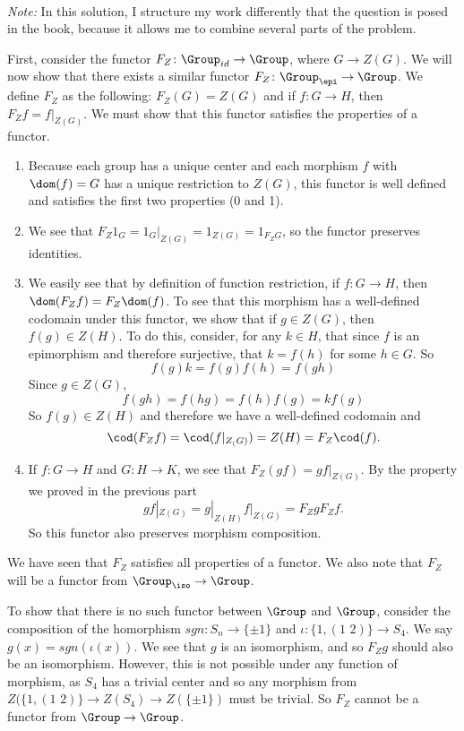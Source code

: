 \documentclass[main.tex]{subfiles}
\begin{document}
\paragraph{}
\textit{Note:} In this solution, I structure my work differently that the
question is posed in the book, because it allows me to combine several parts of
the problem.

First, consider the functor $F_Z\colon \Group_{id}\rightarrow \Group$, where $G
\rightarrow Z(G)$. We will now show that there exists a similar functor $F_Z\colon
\Group_\epi \rightarrow \Group$. We define $F_Z$ as the following: $F_Z(G) =
Z(G)$ and if $f\colon G \rightarrow H$, then $F_{Z} f = f|_{Z(G)}$. We must show that
this functor satisfies the properties of a functor.
\begin{enumerate}
	\item Because each group has a unique center and each morphism $f$ with
		$\dom(f) = G$ has a unique restriction to $Z(G)$, this functor is well
		defined and satisfies the first two properties (0 and 1).

	\item We see that $F_{Z} 1_{G} = 1_{G}|_{Z(G)} = 1_{Z(G)} = 1_{F_{Z}G}$, so
		the functor preserves identities.

	\item We easily see that by definition of function restriction, if $f\colon G
		\rightarrow H$, then $\dom(F_{Z}f) = F_{Z}\dom(f)$. To see that this
		morphism has a well-defined codomain under this functor, we show that if
		$g \in Z(G)$, then $f(g) \in Z(H)$. To do this, consider, for any $k \in
		H$, that since $f$ is an epimorphism and therefore surjective, that $k =
		f(h)$ for some $h \in G$. So \[f(g)k = f(g)f(h) = f(gh)\]Since $g \in
		Z(G)$, \[f(gh) = f(hg) = f(h)f(g) = kf(g)\] So $f(g) \in Z(H)$ and
		therefore we have a well-defined codomain and  \[\cod(F_{Z}f) =
		\cod(f|_{Z_(G)}) = Z(H) = F_{Z}\cod(f).\]

	\item If $f\colon G \rightarrow H$ and $G\colon H \rightarrow K$, we see that $F_Z(gf)
		= gf|_{Z(G)}$. By the property we proved in the previous part
		\[gf|_{Z(G)} = g|_{Z(H)}f|_{Z(G)} = F_ZgF_Zf.\] So this functor also
		preserves morphism composition.
\end{enumerate}

We have seen that $F_Z$ satisfies all properties of a functor. We also note that
$F_Z$ will be a functor from $\Group_\iso \rightarrow \Group$.

To show that there is no such functor between $\Group$ and $\Group$, consider the
composition of the homorphism $sgn\colon S_n \rightarrow \{ \pm 1 \} $ and $\iota\colon
\{1, (1 \,\, 2) \} \rightarrow S_4$. We say $ g(x) = sgn(\iota(x))$. We see that
$g$ is an isomorphism, and so $F_Zg$ should also be an isomorphism. However,
this is not possible under any function of morphism, as $S_4$ has a trivial
center and so any morphism from $Z(\{1, (1\,\,2)\} \rightarrow Z(S_4)
\rightarrow Z(\{\pm 1\})$ must be trivial. So $F_Z$ cannot be a functor from
$\Group \rightarrow \Group$.
\end{document}
